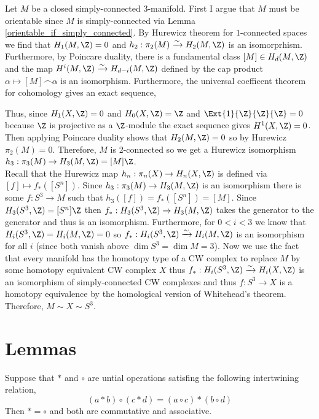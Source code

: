 \documentclass[12pt]{extarticle}
\begin{document}
Let $M$ be a closed simply-connected 3-manifold. First I argue that $M$ must be orientable since $M$ is simply-connected via Lemma \ref{orientable_if_simply_connected}.  By Hurewicz theorem for $1$-connected spaces we find that $H_1(M, \Z) = 0$ and $h_2 : \pi_2(M) \xrightarrow{\sim} H_2(M, \Z)$ is an isomorprhism. Furthermore, by Poincare duality, there is a fundamental class $[M] \in H_d(M, \Z)$ and the map $H^i(M, \Z) \xrightarrow{\sim} H_{d-i}(M, \Z)$ defined by the cap product $\alpha \mapsto [M] \frown \alpha$ is an isomorphism. Furthermore, the universal coefficent theorem for cohomology gives an exact sequence,
\begin{center}
\end{center}
Thus, since $H_1(X, \Z) = 0$ and $H_0(X, \Z) = \Z$ and $\Ext{1}{\Z}{\Z}{\Z} = 0$ because $\Z$ is projective as a $\Z$-module the exact sequence gives $H^1(X, \Z) = 0$. Then applying Poincare duality shows that $H_2(M, \Z) = 0$ so by Hurewicz $\pi_2(M) = 0$. Therefore, $M$ is 2-connected so we get a Hurewicz isomorphism $h_3 : \pi_3(M) \to H_3(M, \Z) = [M] \Z$. 
\bigskip\\
Recall that the Hurewicz map $h_n : \pi_n(X) \to H_n(X, \Z)$ is defined via $[f] \mapsto f_*([S^n])$. Since $h_3 : \pi_3(M) \to H_3(M, \Z)$ is an isomorphism there is some $f : S^3 \to M$ such that $h_3([f]) = f_*([S^n]) = [M]$. Since $H_3(S^3, \Z) = [S^n] \Z$ then $f_* : H_3(S^3, \Z) \to H_3(M, \Z)$ takes the generator to the generator and thus is an isomorphism. Furthermore, for $0 < i < 3$ we know that $H_i(S^3, \Z) = H_i(M, \Z) = 0$ so $f_* : H_i(S^3, \Z) \xrightarrow{\sim} H_i(M, \Z)$ is an isomorphism for all $i$ (since both vanish above $\dim{S^3} = \dim{M} = 3$). Now we use the fact that every manifold has the homotopy type of a CW complex to replace $M$ by some homotopy equivalent CW complex $X$ thus $f_* : H_i(S^3, \Z) \xrightarrow{\sim} H_i(X, \Z)$ is an isomorphism of simply-connected CW complexes and thus $f : S^3 \to X$ is a homotopy equivalence by the homological version of Whitehead's theorem. Therefore, $M \sim X \sim S^3$. 

\section{Lemmas}

\label{Eckmann_Hilton}
\begin{lemma}
Suppose that $*$ and $\circ$ are untial operations satisfing the following intertwining relation,
\[ (a * b) \circ (c * d) = (a \circ c) * (b \circ d) \]
Then $* = \circ$ and both are commutative and associative. 
\end{lemma}
\end{document}
